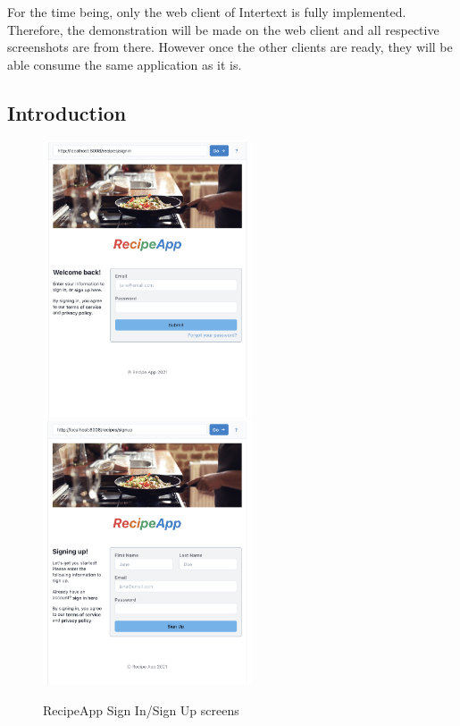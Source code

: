 For the time being, only the web client of Intertext is fully implemented. Therefore, the demonstration will be made on the web client and all respective screenshots are from there. However once the other clients are ready, they will be able consume the same application as it is.

\subsection{Introduction}

\begin{figure}[htb]
  \centering
  \includegraphics[width=6.2cm]{thesis/paper/images/rec_signin.png}
  \,
  \includegraphics[width=6.2cm]{thesis/paper/images/res_signup.png}
  \caption{RecipeApp Sign In/Sign Up screens}%
  \label{fig:rec_signin_signup}%
\end{figure}

